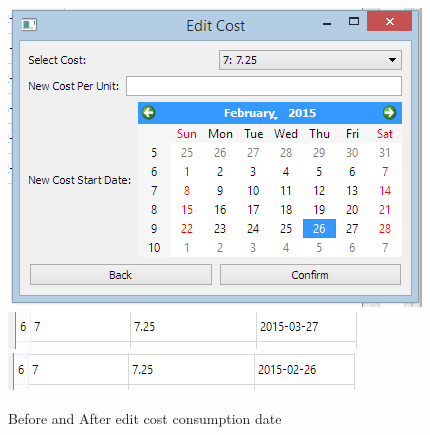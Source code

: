 \begin{figure}[H]
	\includegraphics{./testing/images/test_3_4_edit_cost_date_data.png}
	\includegraphics{./testing/images/test_3_4_edit_cost_date_before.png}
	\includegraphics{./testing/images/test_3_4_edit_cost_date_after.png}
	\caption{Before and After edit cost consumption date} \label{fig:test_3.4_result}
\end{figure}

